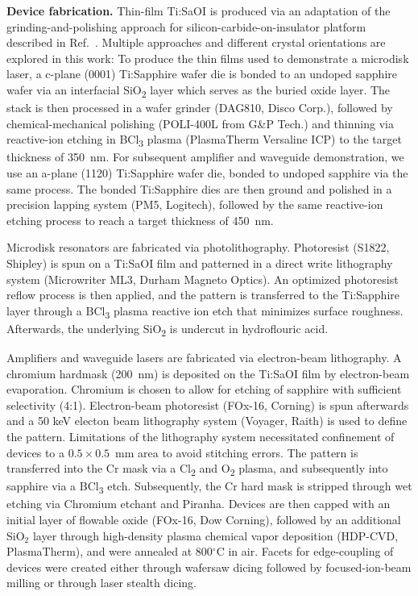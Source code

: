 \documentclass[amsmath, amsthm, amssymb, aps, prb, superscriptaddress, twocolumn, nofootinbib, 10pt]{revtex4-1}%
\begin{document}
\noindent\textbf{Device fabrication.} 
Thin-film Ti:SaOI is produced via an adaptation of the grinding-and-polishing approach for silicon-carbide-on-insulator platform described in Ref.~\cite{lukin20204h}. Multiple approaches and different crystal orientations are explored in this work: To produce the thin films used to demonstrate a microdisk laser, a c-plane (0001) Ti:Sapphire wafer die is bonded to an undoped sapphire wafer via an interfacial SiO\textsubscript{2} layer which serves as the buried oxide layer. The stack is then processed in a wafer grinder (DAG810, Disco Corp.), followed by chemical-mechanical polishing (POLI-400L from G\&P Tech.) and thinning via reactive-ion etching in BCl\textsubscript{3} plasma (PlasmaTherm Versaline ICP) to the target thickness of 350~nm. For subsequent amplifier and waveguide demonstration, we use an a-plane (1120) Ti:Sapphire wafer die, bonded to undoped sapphire via the same process. The bonded Ti:Sapphire dies are then ground and polished in a precision lapping system (PM5, Logitech), followed by the same reactive-ion etching process to reach a target thickness of 450~nm.

Microdisk resonators are fabricated via photolithography. Photoresist (S1822, Shipley) is spun on a Ti:SaOI film and patterned in a direct write lithography system (Microwriter ML3, Durham Magneto Optics). An optimized photoresist reflow process is then applied\cite{lukin2023multiemitter}, and the pattern is transferred to the Ti:Sapphire layer through a BCl\textsubscript{3} plasma reactive ion etch that minimizes surface roughness. Afterwards, the underlying SiO\textsubscript{2} is undercut in hydroflouric acid. 

Amplifiers and waveguide lasers are fabricated via electron-beam lithography. A chromium hardmask (200~nm) is deposited on the Ti:SaOI film by electron-beam evaporation. Chromium is chosen to allow for etching of sapphire with sufficient selectivity (4:1). Electron-beam photoresist (FOx-16, Corning) is spun afterwards and a 50 keV electon beam lithography system (Voyager, Raith) is used to define the pattern. Limitations of the lithography system necessitated confinement of devices to a $0.5\times0.5$~mm area to avoid stitching errors. The pattern is transferred into the Cr mask via a Cl\textsubscript{2} and O\textsubscript{2} plasma, and subsequently into sapphire via a BCl\textsubscript{3} etch. Subsequently, the Cr hard mask is stripped through wet etching via Chromium etchant and Piranha. Devices are then capped with an initial layer of flowable oxide (FOx-16, Dow Corning), followed by an additional SiO$_2$ layer through high-density plasma chemical vapor deposition (HDP-CVD, PlasmaTherm), and were annealed at 800$^{\circ}$C in air. Facets for edge-coupling of devices were created either through wafersaw dicing followed by focused-ion-beam milling or through laser stealth dicing.
\newline
\end{document}
